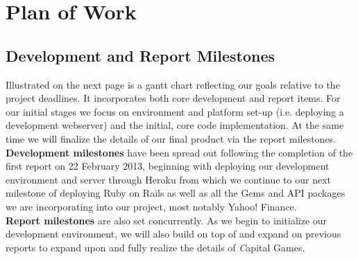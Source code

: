 \chapter{Plan of Work}

\section{Development and Report Milestones}

Illustrated on the next page is a gantt chart reflecting our goals relative
to the project deadlines. It incorporates both core development and report items.
For our initial stages we focus on environment and platform set-up (i.e.
deploying a development webserver) and the initial, core code implementation. At
the same time we will finalize the details of our final product via the report
milestones. \\ 

{\bfseries Development milestones} have been spread out following the completion 
of the first report on 22 February 2013, beginning with deploying our development
 environment and server through Heroku from which we continue to our next 
 milestone of deploying Ruby on Rails as well as all the Gems and API packages we are incorporating into our project, most notably Yahoo! Finance. \\

{\bfseries Report milestones} are also set concurrently. As we begin to initialize
our development environment, we will also build on top of and expand on previous
reports to expand upon and fully realize the details of {\textit Capital Games}.



